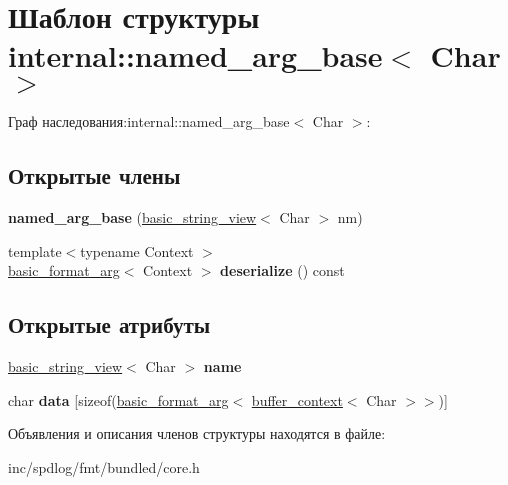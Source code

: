 \hypertarget{structinternal_1_1named__arg__base}{}\section{Шаблон структуры internal\+:\+:named\+\_\+arg\+\_\+base$<$ Char $>$}
\label{structinternal_1_1named__arg__base}


Граф наследования\+:internal\+:\+:named\+\_\+arg\+\_\+base$<$ Char $>$\+:
\subsection*{Открытые члены}
\begin{DoxyCompactItemize}
\item 
\mbox{\label{structinternal_1_1named__arg__base_aafeb592879eaf163dea5d7a74219fba5}} 
{\bfseries named\+\_\+arg\+\_\+base} (\hyperlink{classbasic__string__view}{basic\+\_\+string\+\_\+view}$<$ Char $>$ nm)
\item 
\mbox{\label{structinternal_1_1named__arg__base_ac9c635fcb1ecc29ef4aacfb73c870292}} 
{\footnotesize template$<$typename Context $>$ }\\\hyperlink{classbasic__format__arg}{basic\+\_\+format\+\_\+arg}$<$ Context $>$ {\bfseries deserialize} () const
\end{DoxyCompactItemize}
\subsection*{Открытые атрибуты}
\begin{DoxyCompactItemize}
\item 
\mbox{\label{structinternal_1_1named__arg__base_a06a112fdd55d3e5ad86d0d1c343e63e0}} 
\hyperlink{classbasic__string__view}{basic\+\_\+string\+\_\+view}$<$ Char $>$ {\bfseries name}
\item 
\mbox{\label{structinternal_1_1named__arg__base_a95ed5e42d9d90929fe0b49f2204db860}} 
char {\bfseries data} \mbox{[}sizeof(\hyperlink{classbasic__format__arg}{basic\+\_\+format\+\_\+arg}$<$ \hyperlink{classbasic__format__context}{buffer\+\_\+context}$<$ Char $>$$>$)\mbox{]}
\end{DoxyCompactItemize}


Объявления и описания членов структуры находятся в файле\+:\begin{DoxyCompactItemize}
\item 
inc/spdlog/fmt/bundled/core.\+h\end{DoxyCompactItemize}
